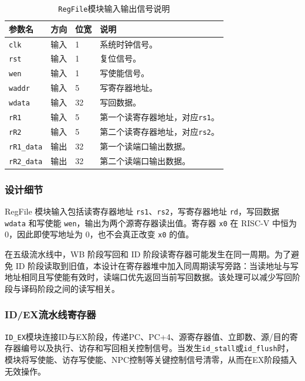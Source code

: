 \documentclass[UTF8,a4paper,12pt]{ctexart}
\newcommand{\code}[1]{\texttt{#1}}
\begin{document}
\begin{table}[H]
\centering
\caption{\code{RegFile}模块输入输出信号说明}
\footnotesize
\renewcommand{\arraystretch}{1.15}
\begin{tabularx}{\textwidth}{p{3.2cm}p{1.5cm}p{2.1cm}X}
\toprule
参数名 & 方向 & 位宽 & 说明 \\
\midrule
\code{clk} & 输入 & 1 & 系统时钟信号。 \\
\code{rst} & 输入 & 1 & 复位信号。 \\
\code{wen} & 输入 & 1 & 写使能信号。 \\
\code{waddr} & 输入 & 5 & 写寄存器地址。 \\
\code{wdata} & 输入 & 32 & 写回数据。 \\
\code{rR1} & 输入 & 5 & 第一个读寄存器地址，对应\code{rs1}。 \\
\code{rR2} & 输入 & 5 & 第二个读寄存器地址，对应\code{rs2}。 \\
\code{rR1\_data} & 输出 & 32 & 第一个读端口输出数据。 \\
\code{rR2\_data} & 输出 & 32 & 第二个读端口输出数据。 \\
\bottomrule
\end{tabularx}
\end{table}

\subsubsection*{设计细节}

RegFile 模块输入包括读寄存器地址 \code{rs1}、\code{rs2}，写寄存器地址 \code{rd}，写回数据 \code{wdata} 和写使能 \code{wen}，输出为两个源寄存器读出值。寄存器 \code{x0} 在 RISC-V 中恒为 0，因此即使写地址为 0，也不会真正改变 \code{x0} 的值。

在五级流水线中，WB 阶段写回和 ID 阶段读寄存器可能发生在同一周期。为了避免 ID 阶段读取到旧值，本设计在寄存器堆中加入同周期读写旁路：当读地址与写地址相同且写使能有效时，读端口优先返回当前写回数据。该处理可以减少写回阶段与译码阶段之间的读写相关。

\subsubsection{ID/EX流水线寄存器}

\code{ID\_EX}模块连接ID与EX阶段，传递PC、PC+4、源寄存器值、立即数、源/目的寄存器编号以及执行、访存和写回相关控制信号。当发生\code{id\_stall}或\code{id\_flush}时，模块将写使能、访存写使能、NPC控制等关键控制信号清零，从而在EX阶段插入无效操作。
\end{document}
